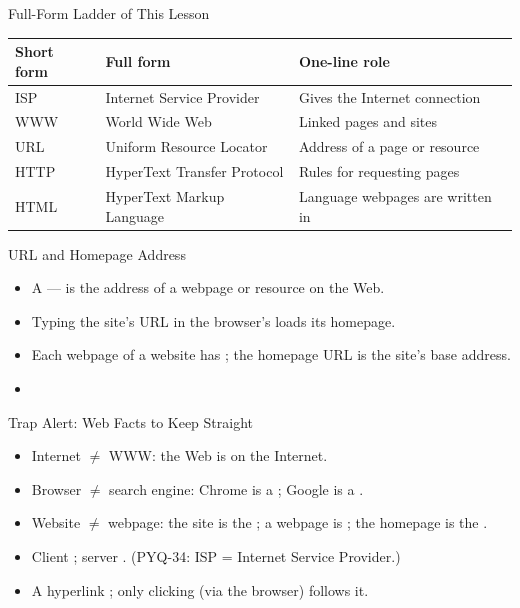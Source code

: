 \documentclass[aspectratio=169]{beamer}
\begin{document}
\begin{frame}{Full-Form Ladder of This Lesson}
  \begin{center}
    \begin{tabular}{lll}
      \toprule
      \textbf{Short form} & \textbf{Full form} & \textbf{One-line role} \\
      \midrule
      ISP & Internet Service Provider & Gives the Internet connection \\
      WWW & World Wide Web & Linked pages and sites \\
      URL & Uniform Resource Locator & Address of a page or resource \\
      HTTP & HyperText Transfer Protocol & Rules for requesting pages \\
      HTML & HyperText Markup Language & Language webpages are written in \\
      \bottomrule
    \end{tabular}
  \end{center}
  \vspace{0.25cm}
\end{frame}

\begin{frame}{URL and Homepage Address}
  \begin{itemize}
    \item A  --- is the address of a
      webpage or resource on the Web.
    \item Typing the site's URL in the browser's  loads its
      homepage.
    \item Each webpage of a website has ; the homepage URL is
      the site's base address.
    \item {}
  \end{itemize}
\end{frame}

\begin{frame}{Trap Alert: Web Facts to Keep Straight}
  \begin{itemize}
    \item Internet $\neq$ WWW: the Web is  on the Internet.
    \item Browser $\neq$ search engine: Chrome is a ; Google is
      a .
    \item Website $\neq$ webpage: the site is the ; a
      webpage is ; the homepage is the .
    \item Client ; server . (PYQ-34: ISP =
      Internet Service Provider.)
    \item A hyperlink ; only clicking (via the browser) follows
      it.
  \end{itemize}
\end{frame}
\end{document}
